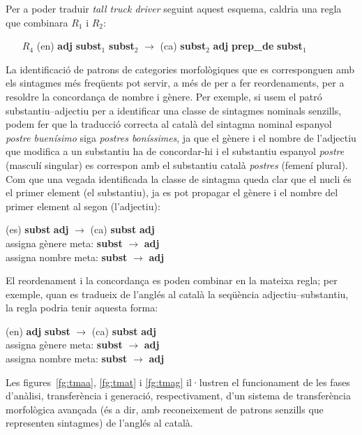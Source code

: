 Per a poder traduir \emph{tall truck driver} seguint aquest esquema, caldria una regla que combinara \(R_1\) i \(R_2\):
\begin{itemize}
\item[$R_4$] (en) \textbf{adj} \textbf{subst}$_1$ \textbf{subst}$_2$ 
$\rightarrow$ (ca) \textbf{subst}$_2$ \textbf{adj} \textbf{prep\_de} \textbf{subst}$_1$ 
\end{itemize}  


La identificació de patrons de categories morfològiques que es
corresponguen amb els sintagmes més freqüents pot servir, a més de per
a fer reordenaments, per a resoldre la concordança de nombre i
gènere. Per exemple, si usem el patró substantiu--adjectiu per a
identificar una classe de sintagmes nominals senzills, podem fer que
la traducció correcta al català del sintagma nominal espanyol {\em
  postre buenísimo} siga \emph{postres boníssimes}, ja que el gènere i
el nombre de l'adjectiu que modifica a un substantiu ha de
concordar-hi i el substantiu espanyol \emph{postre} (masculí singular)
es correspon amb el substantiu català \emph{postres} (femení plural).
Com que una vegada identificada la classe de sintagma queda clar que
el nucli és el primer element (el substantiu), ja es pot propagar el
gènere i el nombre del primer element al segon (l'adjectiu):
\begin{center}
 (es) \textbf{subst} \textbf{adj}  \(\to\) (ca) \textbf{subst} \textbf{adj} \\
  assigna gènere meta: \textbf{subst} \(\to\) \textbf{adj}\\
  assigna nombre meta: \textbf{subst} \(\to\) \textbf{adj}
    \end{center}

    El reordenament i la concordança es poden combinar en la mateixa
    regla; per exemple, quan es tradueix de l'anglés al català la seqüència adjectiu--substantiu, la regla podria tenir aquesta forma:    \begin{center}
      (en) \textbf{adj} \textbf{subst} \(\to\) (ca) \textbf{subst} \textbf{adj} \\
      assigna gènere meta: \textbf{subst} \(\to\) \textbf{adj}\\
      assigna nombre meta: \textbf{subst} \(\to\) \textbf{adj}
    \end{center}


Les figures~\ref{fg:tmaa}, \ref{fg:tmat} i \ref{fg:tmag} il·lustren el
funcionament de les fases d'anàlisi, transferència i generació,
respectivament, d'un sistema de transferència morfològica avançada (és
a dir, amb reconeixement de patrons senzills que representen
sintagmes) de l'anglés al català.


